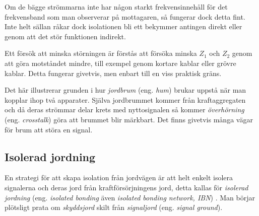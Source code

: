 Om de bägge strömmarna inte har någon starkt frekvensinnehåll för det
frekvensband som man observerar på mottagaren, så fungerar dock detta fint.
Inte helt sällan råkar dock isolationen bli ett bekymmer antingen direkt eller
genom att det stör funktionen indirekt.

Ett försök att minska störningen är förstås att försöka minska \(Z_1\) och
\(Z_2\) genom att göra motståndet mindre, till exempel genom kortare kablar
eller grövre kablar.
Detta fungerar givetvis, men enbart till en viss praktisk gräns.

Det här illustrerar grunden i hur \emph{jordbrum} (eng. \emph{hum}) brukar
uppstå när man kopplar ihop två apparater.
Själva jordbrummet kommer från kraftaggregaten och då deras strömmar delar
krets med nyttosignalen så kommer \emph{överhörning} (eng. \emph{crosstalk})
göra att brummet blir märkbart.
Det finns givetvis många vägar för brum att störa en signal.

\subsection{Isolerad jordning}

En strategi för att skapa isolation från jordvägen är att helt enkelt
isolera signalerna och deras jord från kraftförsörjningens jord, detta kallas
för \emph{isolerad jordning} (eng. \emph{isolated bonding} även \emph{isolated
 bonding network, IBN}) \cite[kap 3.2.4]{K27-1991}.
Man börjar plötsligt prata om \emph{skyddsjord} skilt från \emph{signaljord}
(eng. \emph{signal ground}).


